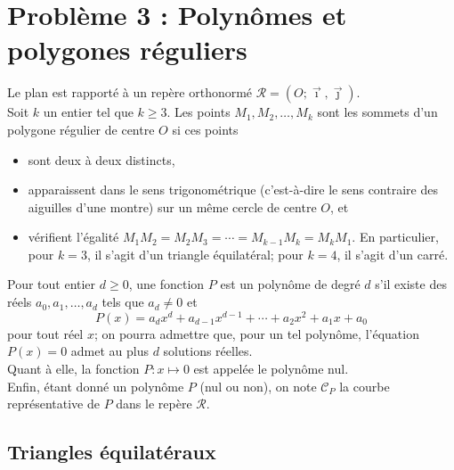 \documentclass[landscape,twocolumn,leqno,a4paper,10pt]{report} %
\renewcommand{\geq}{\geqslant}
\begin{document}
\section{Problème 3 : Polynômes et polygones réguliers}

Le plan est rapporté à un repère orthonormé $\mathscr{R}=(O ; \vec{\imath}, \vec{\jmath})$.\\
Soit $k$ un entier tel que $k \geq 3$. Les points $M_{1}, M_{2}, \ldots, M_{k}$ sont les sommets d'un polygone régulier de centre $O$ si ces points
\begin{itemize}
	\item[$\triangleright$] sont deux à deux distincts,
	\item[$\triangleright$] apparaissent dans le sens trigonométrique (c'est-à-dire le sens contraire des aiguilles d'une montre) sur un même cercle de centre $O$, et
	\item[$\triangleright$] vérifient l'égalité $M_{1} M_{2}=M_{2} M_{3}=\cdots=M_{k-1} M_{k}=M_{k} M_{1}$. En particulier, pour $k=3$, il s'agit d'un triangle équilatéral; pour $k=4$, il s'agit d'un carré.
\end{itemize}
Pour tout entier $d \geq 0$, une fonction $P$ est un polynôme de degré $d$ s'il existe des réels $a_{0}, a_{1}, \ldots, a_{d}$ tels que $a_{d} \neq 0$ et
$$P(x)=a_{d} x^{d}+a_{d-1} x^{d-1}+\cdots+a_{2} x^{2}+a_{1} x+a_{0}$$
pour tout réel $x$; on pourra admettre que, pour un tel polynôme, l'équation $P(x)=0$ admet au plus $d$ solutions réelles.\\
Quant à elle, la fonction $P: x \mapsto 0$ est appelée le polynôme nul.\\
Enfin, étant donné un polynôme $P$ (nul ou non), on note $\mathscr{C}_{P}$ la courbe représentative de $P$ dans le repère $\mathscr{R}$.

\subsection{Triangles équilatéraux}
\end{document}
